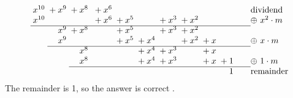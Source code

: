 \begin{worked}
\[\begin{array}{@{}*{11}{@{\;}r}@{\qquad}l@{}}
x^{10} & {}+x^{9} & {}+x^{8} &  & {}+x^{6} &  &  &  &  &  &  & \text{dividend}\\
x^{10} &  &  &  & {}+x^{6} & {}+x^{5} &  & {}+x^{3} & {}+x^{2} &  &  & \oplus\ x^{2}\cdot m\\
\cline{1-11}
 & x^{9} & {}+x^{8} &  &  & {}+x^{5} &  & {}+x^{3} & {}+x^{2} &  &  & \\
 & x^{9} &  &  &  & {}+x^{5} & {}+x^{4} &  & {}+x^{2} & {}+x &  & \oplus\ x\cdot m\\
\cline{2-11}
 &  & x^{8} &  &  &  & {}+x^{4} & {}+x^{3} &  & {}+x &  & \\
 &  & x^{8} &  &  &  & {}+x^{4} & {}+x^{3} &  & {}+x & {}+1 & \oplus\ 1\cdot m\\
\cline{3-11}
 &  &  &  &  &  &  &  &  &  & 1  & \text{remainder}\\
\end{array}
\]
The remainder is 1, so the answer is correct \checkmark.
\end{worked}


